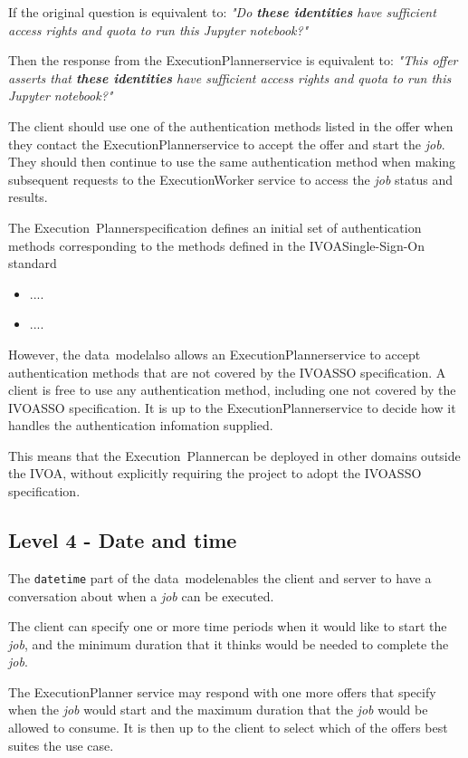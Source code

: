 \documentclass[11pt,a4paper]{ivoa}
\newcommand{\datamodel} {data~model}
\newcommand{\ivoa} {IVOA}
\newcommand{\execplanner} {ExecutionPlanner}
\newcommand{\execworker} {ExecutionWorker}
\newcommand{\executionplanner} {Execution~Planner}
\newcommand{\jupyternotebook} {Jupyter notebook}
\newcommand{\codeword}[1] {\texttt{#1}}
\newcommand{\job} {\textit{job}}
\begin{document}
If the original question is equivalent to:
\textit{"Do \textbf{these identities} have sufficient access rights and quota to run this \jupyternotebook{}?"}

Then the response from the \execplanner service is equivalent to:
\textit{"This offer asserts that \textbf{these identities} have sufficient access rights and quota to run this \jupyternotebook{}?"}

The client should use one of the authentication methods listed in the offer when
they contact the \execplanner service to accept the offer and start the \job{}.
They should then continue to use the same authentication method when making subsequent
requests to the \execworker{} service to access the \job{} status and results.

The \executionplanner specification defines an initial set of authentication methods
corresponding to the methods defined in the
\ivoa Single-Sign-On standard\citep{2017ivoa.spec.0524T}

\begin{itemize}
    \item ....
    \item ....
\end{itemize}

However, the \datamodel also allows an \execplanner service to accept authentication
methods that are not covered by the \ivoa SSO specification.
A client is free to use any authentication method, including one not covered by the
\ivoa SSO specification. It is up to the \execplanner service to decide how it
handles the authentication infomation supplied.

This means that the \executionplanner can be deployed in other domains outside the \ivoa,
without explicitly requiring the project to adopt the \ivoa SSO specification.

\subsection{Level 4 - Date and time}
\label{date-time}

The \codeword{datetime} part of the \datamodel enables the client and server to have a
conversation about when a \job{} can be executed.

The client can specify one or more time periods when it would like to start the \job{},
and the minimum duration that it thinks would be needed to complete the \job{}.

The \execplanner{} service may respond with one more offers that specify when the \job{}
would start and the maximum duration that the \job{} would be allowed to consume.
It is then up to the client to select which of the offers best suites the use case.
\end{document}
